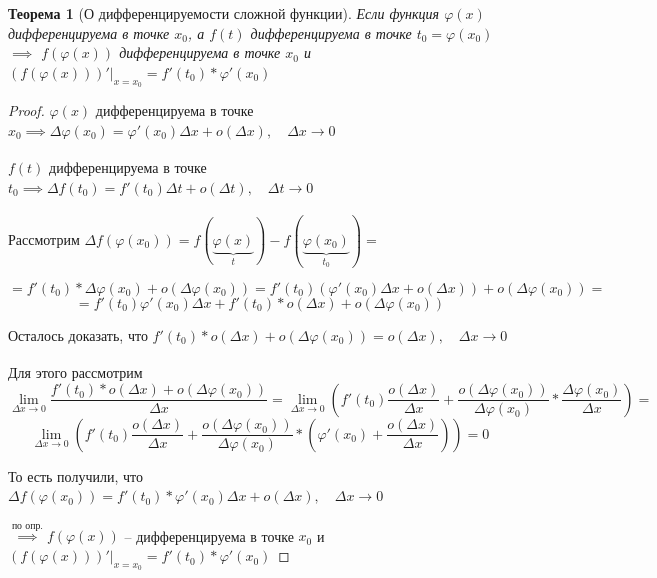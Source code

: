 \documentclass[a4paper,oneside]{article}
\newcommand{\bydef}{\stackrel{\text{по опр.}}{\implies}} %
\newcommand{\dslim}{\displaystyle\lim}
\newcommand{\approach}[1]{\underset{#1}{\longrightarrow}}
\newtheorem{theorem}{Теорема}[subsection]
\theoremstyle{definition}
\theoremstyle{definition}
\theoremstyle{definition}
\begin{document}
\begin{theorem}[О дифференцируемости сложной функции]
    Если функция $\varphi (x)$ дифференцируема в точке $x_0$, а $f(t)$ 
    дифференцируема в точке $t_0 = \varphi (x_0)$ $\implies$
    $f(\varphi (x))$ дифференцируема в точке $x_0$ и
    $(f(\varphi (x)))' |_{x = x_0} = f'(t_0) * \varphi' (x_0)$
\end{theorem}
\begin{proof}
    $\varphi (x)$ дифференцируема в точке $x_0 \implies \Delta \varphi (x_0) = \varphi' (x_0) \Delta x + o(\Delta x), \quad \Delta x \approach{} 0$

    $f(t)$ дифференцируема в точке $t_0 \implies \Delta f(t_0) = f'(t_0) \Delta t + o(\Delta t), \quad \Delta t \approach{} 0$

    Рассмотрим $\Delta f(\varphi (x_0)) = f(\underbrace{\varphi (x)}_t) - f(\underbrace{\varphi (x_0)}_{t_0}) =$

    \[ 
        = f'(t_0) * \Delta \varphi (x_0) + o(\Delta \varphi (x_0))
        = f'(t_0) (\varphi' (x_0) \Delta x + o(\Delta x)) + o(\Delta \varphi (x_0)) =
    \]
    \[ = f'(t_0) \varphi'(x_0) \Delta x + f'(t_0) * o(\Delta x) + o(\Delta \varphi (x_0)) \]

    Осталось доказать, что $f'(t_0) * o(\Delta x) + o(\Delta \varphi (x_0)) = o(\Delta x), \quad \Delta x \approach{} 0$

    Для этого рассмотрим 
    \[
        \dslim_{\Delta x \to 0} \frac{f'(t_0) * o(\Delta x) + o(\Delta \varphi (x_0))}{\Delta x} =
        \dslim_{\Delta x \to 0} \left( f'(t_0) \frac{o(\Delta x)}{\Delta x} + \frac{o(\Delta \varphi (x_0))}{\Delta \varphi (x_0)} * \frac{\Delta \varphi (x_0)}{\Delta x} \right) =
    \]
    \[ \dslim_{\Delta x \to 0} \left( f'(t_0) \frac{o(\Delta x)}{\Delta x} + \frac{o(\Delta \varphi (x_0))}{\Delta \varphi (x_0)} * \left( \varphi' (x_0) + \frac{o(\Delta x)}{\Delta x} \right) \right) = 0\]

    То есть получили, что $\Delta f(\varphi (x_0)) = f'(t_0) * \varphi' (x_0) \Delta x + o(\Delta x), \quad \Delta x \approach{} 0$

    $\bydef f(\varphi (x))$ -- дифференцируема в точке $x_0$ и $(f(\varphi (x)))' |_{x = x_0} = f'(t_0) * \varphi' (x_0)$

\end{proof}
\end{document}
